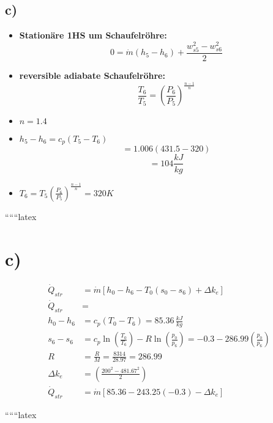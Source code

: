 

\subsection*{c)}

\begin{itemize}
    \item \textbf{Stationäre 1HS um Schaufelröhre:}
    \[
    0 = \dot{m} \left( h_5 - h_6 \right) + \frac{w_{s5}^2 - w_{s6}^2}{2}
    \]
    \item \textbf{reversible adiabate Schaufelröhre:}
    \[
    \frac{T_6}{T_5} = \left( \frac{P_6}{P_5} \right)^{\frac{n-1}{n}}
    \]
    \item \( n = 1.4 \)
    \item \( h_5 - h_6 = c_p (T_5 - T_6) \)
    \[
    = 1.006 (431.5 - 320)
    \]
    \[
    = 104 \frac{kJ}{kg}
    \]
    \item \( T_6 = T_5 \left( \frac{P_6}{P_5} \right)^{\frac{n-1}{n}} = 320 K \)
\end{itemize}

``````latex



\section*{c)}

\begin{align*}
\dot{Q}_{str} &= \dot{m} \left[ h_0 - h_6 - T_0(s_0 - s_6) + \Delta k_e \right] \\
\dot{Q}_{str} &= \\
h_0 - h_6 &= c_p (T_0 - T_6) = 85.36 \, \frac{kJ}{kg} \\
s_6 - s_6 &= c_p \ln \left( \frac{T_0}{T_6} \right) - R \ln \left( \frac{p_0}{p_6} \right) = -0.3 - 286.99 \left( \frac{p_0}{p_6} \right) \\
R &= \frac{R}{M} = \frac{8314}{28.97} = 286.99 \\
\Delta k_e &= \left( \frac{200^2 - 481.67^2}{2} \right) \\
\dot{Q}_{str} &= \dot{m} \left[ 85.36 - 243.25 (-0.3) - \Delta k_e \right]
\end{align*}

``````latex